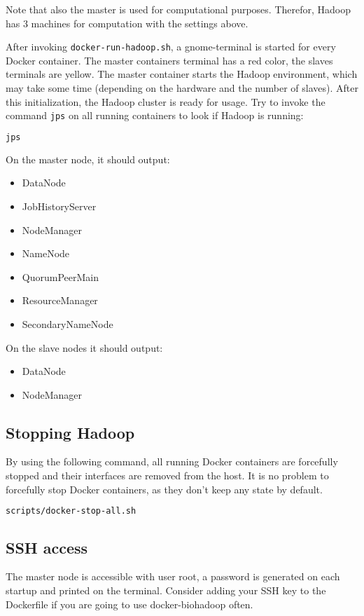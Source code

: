 Note that also the master is used for computational purposes. Therefor, Hadoop has 3 machines for computation with the settings above.

After invoking \texttt{docker-run-hadoop.sh}, a gnome-terminal is started for every Docker container. The master containers terminal has a red color, the slaves terminals are yellow. The master container starts the Hadoop environment, which may take some time (depending on the hardware and the number of slaves). After this initialization, the Hadoop cluster is ready for usage. Try to invoke the command \texttt{jps} on all running containers to look if Hadoop is running:

\begin{lstlisting}[language=bash]
jps
\end{lstlisting}

On the master node, it should output:
\begin{itemize}
  \item DataNode
  \item JobHistoryServer
  \item NodeManager
  \item NameNode
  \item QuorumPeerMain
  \item ResourceManager
  \item SecondaryNameNode
\end{itemize}

On the slave nodes it should output:
\begin{itemize}
  \item DataNode
  \item NodeManager
\end{itemize}

\subsection{Stopping Hadoop}
By using the following command, all running Docker containers are forcefully stopped and their interfaces are removed from the host. It is no problem to forcefully stop Docker containers, as they don't keep any state by default.
\begin{lstlisting}[language=bash]
scripts/docker-stop-all.sh
\end{lstlisting}

\subsection{SSH access}
The master node is accessible with user root, a password is generated on each startup and printed on the terminal. Consider adding your SSH key to the Dockerfile if you are going to use docker-biohadoop often.

